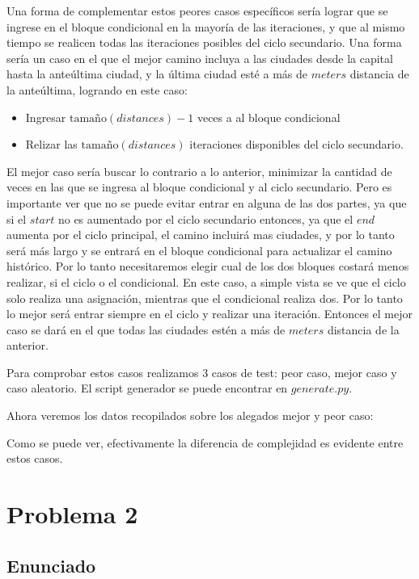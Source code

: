 \documentclass{article}
\theoremstyle{definition}
\theoremstyle{remark}
\begin{document}
Una forma de complementar estos peores casos específicos sería lograr que se ingrese en el bloque condicional en la mayoría de las iteraciones, y que al mismo tiempo se realicen todas las iteraciones posibles del ciclo secundario. Una forma sería un caso en el que el mejor camino incluya a las ciudades desde la capital hasta la anteúltima ciudad, y la última ciudad esté a más de $meters$ distancia de la anteúltima, logrando en este caso:
\begin{itemize}
\item Ingresar $\text{tamaño}(distances)-1$ veces a al bloque condicional
\item Relizar las $\text{tamaño}(distances)$ iteraciones disponibles del ciclo secundario.
\end{itemize}
\newline
El mejor caso sería buscar lo contrario a lo anterior, minimizar la cantidad de veces en las que se ingresa al bloque condicional y al ciclo secundario. Pero es importante ver que no se puede evitar entrar en alguna de las dos partes, ya que si el $start$ no es aumentado por el ciclo secundario entonces, ya que el $end$ aumenta por el ciclo principal, el camino incluirá mas ciudades, y por lo tanto será más largo y se entrará en el bloque condicional para actualizar el camino histórico. Por lo tanto necesitaremos elegir cual de los dos bloques costará menos realizar, si el ciclo o el condicional. En este caso, a simple vista se ve que el ciclo solo realiza una asignación, mientras que el condicional realiza dos. Por lo tanto lo mejor será entrar siempre en el ciclo y realizar una iteración. Entonces el mejor caso se dará en el que todas las ciudades estén a más de $meters$ distancia de la anterior.

Para comprobar estos casos realizamos 3 casos de test: peor caso, mejor caso y caso aleatorio. El script generador se puede encontrar en $generate.py$.

Ahora veremos los datos recopilados sobre los alegados mejor y peor caso:

Como se puede ver, efectivamente la diferencia de complejidad es evidente entre estos casos. 

\section{Problema 2}

\subsection{Enunciado}
\end{document}

